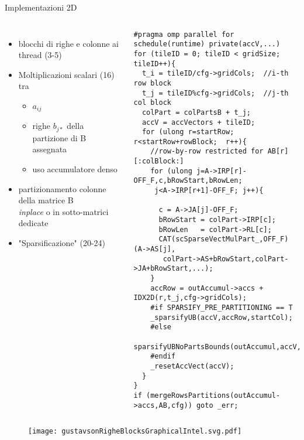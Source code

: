 \begin{frame}[fragile]  {Implementazioni 2D}
\begin{columns}
	\begin{itemize}
		\item	blocchi di righe e colonne ai thread (3-5)
		\item	Moltiplicazioni scalari (16) tra
		\begin{itemize}
			\item	$a_{ij}$
			\item	righe $b_{j*}$ della partizione di B assegnata
			\item	uso accumulatore denso
		\end{itemize}
		\item	partizionamento colonne della matrice B\\
				\emph{inplace} o in sotto-matrici dedicate
		\item	"Sparsificazione" (20-24)
	\end{itemize}

	\begin{lstlisting}
#pragma omp parallel for schedule(runtime) private(accV,...)
for (tileID = 0; tileID < gridSize; tileID++){
  t_i = tileID/cfg->gridCols;  //i-th row block
  t_j = tileID%cfg->gridCols;  //j-th col block
  colPart = colPartsB + t_j;
  accV = accVectors + tileID; 
  for (ulong r=startRow;  r<startRow+rowBlock;  r++){
    //row-by-row restricted for AB[r][:colBlock:]
    for (ulong j=A->IRP[r]-OFF_F,c,bRowStart,bRowLen; 
     j<A->IRP[r+1]-OFF_F; j++){

      c = A->JA[j]-OFF_F;
      bRowStart = colPart->IRP[c];
      bRowLen   = colPart->RL[c];
      CAT(scSparseVectMulPart_,OFF_F)(A->AS[j],
       colPart->AS+bRowStart,colPart->JA+bRowStart,...);
    }
    accRow = outAccumul->accs + IDX2D(r,t_j,cfg->gridCols);
    #if SPARSIFY_PRE_PARTITIONING == T
    _sparsifyUB(accV,accRow,startCol);
    #else
    sparsifyUBNoPartsBounds(outAccumul,accV,accRow,startCol);
    #endif
    _resetAccVect(accV);
  }
}
if (mergeRowsPartitions(outAccumul->accs,AB,cfg)) goto _err;
	\end{lstlisting}
\end{columns}
	\begin{figure}[H]
  	\centering
	\texttt{[image: gustavsonRigheBlocksGraphicalIntel.svg.pdf]}
	\end{figure}
\end{frame}

